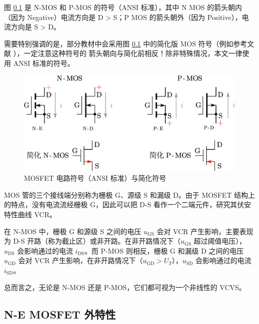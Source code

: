 \documentclass[UTF8]{report}
\theoremstyle{MyLineTheoremStyle} %
\theoremstyle{MyBlockTheoremStyle} %
\theoremstyle{MySubsubsectionStyle} %
\begin{document}
\begin{center}\noindent\begin{minipage}{0.41\columnwidth}
    \hspace*{2em} 图 \ref{} 是 N-MOS 和 P-MOS 的符号（ANSI 标准），其中 N MOS 的箭头朝内（因为 Negative）电流方向是 D > S；P MOS 的箭头朝外（因为 Positive），电流方向是 S > D。

    \hspace*{2em} 需要特别强调的是，部分教材中会采用图 \ref{} 中的简化版 MOS 符号（例如参考文献 \cite{电路原理} \cite{电路原理导学导教}），一定注意这种符号的 {\color{red} 箭头朝向与简化前相反}！除非特殊情况，本文一律使用 ANSI 标准的符号。
\end{minipage}\hfill\begin{minipage}{0.53\columnwidth}
    \begin{figure}[H]\centering
        \includegraphics[width=\columnwidth]{assets/2/MOS管大全.pdf}
        \caption{ MOSFET 电路符号（ANSI 标准）与简化符号 }\label{}
    \end{figure}
\end{minipage}\end{center}



MOS 管的三个接线端分别称为栅极 G、源级 S 和漏级 D。由于 MOSFET 结构上的特点，没有电流流经栅极 G，因此可以把 D-S 看作一个二端元件，研究其伏安特性曲线 VCR。

在 N-MOS 中，栅极 G 和源级 S 之间的电压 $u_{\text{GS}}$ 会对 VCR 产生影响，主要表现为 D-S 开路（称为截止区）或非开路。在非开路情况下（$u_{\text{GS}}$ 超过阈值电压），$u_{\text{DS}}$ 会影响通过的电流 $i_{\text{DS}}$。而 P-MOS 则相反，栅极 G 和漏级 D 之间的电压 $u_{\text{GD}}$ 会对 VCR 产生影响，在非开路情况下（$u_{\text{GD}} > U_T$），$u_{\text{SD}}$ 会影响通过的电流 $i_{\text{SD}}$。

总而言之，无论是 N-MOS 还是 P-MOS，它们都可视为一个非线性的 VCVS。

\subsection{N-E MOSFET 外特性}
\end{document}
